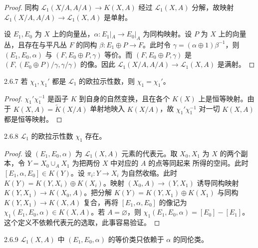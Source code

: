 \begin{proof}
  同构 $\mathcal{L}_1(X/A,A/A)\to K(X,A)$ 经过 $\mathcal{L}_1(X,A)$ 分解，故映射 $\mathcal{L}_1(X/A,A/A)\to\mathcal{L}_1(X,A)$ 是单射。

  设 $E_1,E_0$ 为 $X$ 上的向量丛，$\alpha\colon E_1|_A\to E_0|_A$ 为同构映射。设 $P$ 为 $X$ 上的向量丛，且存在与平凡丛 $F$ 的同构 $\beta\colon E_1\oplus P\to F$。此时令 $\gamma=(\alpha\oplus1)\beta^{-1}$，则 $(E_1,E_0,\alpha)$ 与 $(F,E_0\oplus P,\gamma)$ 等价。而 $(F,E_0\oplus P,\gamma)$ 是 $(F,(E_0\oplus P)/\gamma,\gamma/\gamma)$ 的像。因此 $\mathcal{L}_1(X/A,A/A)\to\mathcal{L}_1(X,A)$ 是满射。
\end{proof}

\begin{lemma*}{2.6.7}
  若 $\chi_1,\chi_1'$ 都是 $\mathcal{L}_1$ 的欧拉示性数，则 $\chi_1=\chi_1'$。
\end{lemma*}

\begin{proof}
  $\chi_1'\chi_1^{-1}$ 是函子 $K$ 到自身的自然变换，且在各个 $K(X)$ 上是恒等映射。由于 $K(X,A)=\tilde K(X/A)$ 单射地映入 $K(X/A)$，故 $\chi_1'\chi_1^{-1}$ 对一切 $K(X,A)$ 都是恒等映射。
\end{proof}

\begin{lemma*}{2.6.8}
  $\mathcal{L}_1$ 的欧拉示性数 $\chi_1$ 存在。
\end{lemma*}

\begin{proof}
  设 $(E_1,E_0,\alpha)$ 为 $\mathcal{L}_1(X,A)$ 元素的代表元。取 $X_0,X_1$ 为 $X$ 的两个副本，令 $Y=X_0\cup_A X_1$ 为把两份 $X$ 中对应的 $A$ 的点等同起来
  所得的空间。此时 $[E_1,\alpha,E_0]\in K(Y)$。设 $\pi_i\colon Y\to X_i$ 为自然收缩。此时 $K(Y)=K(Y,X_i)\oplus K(X_i)$。映射 $(X_0,A)\to(Y,X_1)$ 诱导同构映射 $K(Y,X_1)\to K(X_0,A)$。把分解 $K(Y)=K(Y,X_1)\oplus K(X_1)$ 与同构 $K(Y,X_1)\to K(X,A)$ 复合，再将 $[E_1,\alpha,E_0]$ 的像记为 $\chi_1(E_1,E_0,\alpha)\in K(X,A)$。若 $A=\varnothing$，则 $\chi_1(E_1,E_0,\alpha)=[E_0]-[E_1]$。这个定义不依赖代表元的选取，此事容易验证。
\end{proof}

\begin{corollary*}{2.6.9}
  $\mathcal{L}_1(X,A)$ 中 $(E_1,E_0,\alpha)$ 的等价类只依赖于 $\alpha$ 的同伦类。
\end{corollary*}

